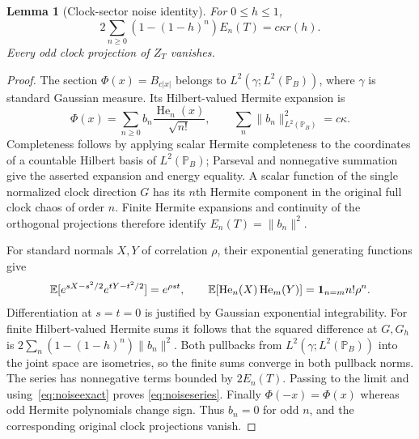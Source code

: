\documentclass[11pt]{article}
\newtheorem{lemma}[theorem]{Lemma}
\begin{document}
\begin{lemma}[Clock-sector noise identity]\label{lem:noiseseries}
For $0\leq h\leq1$,
\begin{equation}\label{eq:noiseseries}
 2\sum_{n\geq0}(1-(1-h)^n)E_n(T)=c\kappa r(h).
\end{equation}
Every odd clock projection of $Z_T$ vanishes.
\end{lemma}
\begin{proof}
The section $\Phi(x)=B_{c|x|}$ belongs to
$L^2(\gamma;L^2(\mathbb P_B))$, where $\gamma$ is standard Gaussian
measure. Its Hilbert-valued Hermite expansion is
\[
 \Phi(x)=\sum_{n\geq0}b_n\frac{\operatorname{He}_n(x)}{\sqrt{n!}},
 \qquad \sum_n\|b_n\|_{L^2(\mathbb P_B)}^2=c\kappa.
\]
Completeness follows by applying scalar Hermite completeness to the
coordinates of a countable Hilbert basis of $L^2(\mathbb P_B)$;
Parseval and nonnegative summation give the asserted expansion and
energy equality. A scalar function of the single normalized clock
direction $G$ has its $n$th Hermite component in the original full
clock chaos of order $n$. Finite Hermite expansions and continuity
of the orthogonal projections therefore identify
$E_n(T)=\|b_n\|^2$.

For standard normals $X,Y$ of correlation $\rho$, their exponential
generating functions give
\[
 \mathbb E[e^{sX-s^2/2}e^{tY-t^2/2}]=e^{\rho st},\qquad
 \mathbb E[\operatorname{He}_n(X)\operatorname{He}_m(Y)]
   =\mathbf1_{n=m}n!\rho^n.
\]
Differentiation at $s=t=0$ is justified by Gaussian exponential
integrability. For finite Hilbert-valued Hermite sums it follows that
the squared difference at $G,G_h$ is
$2\sum_n(1-(1-h)^n)\|b_n\|^2$.
Both pullbacks from $L^2(\gamma;L^2(\mathbb P_B))$ into the joint
space are isometries, so the finite sums converge in both pullback
norms. The series has nonnegative terms bounded by $2E_n(T)$.
Passing to the limit and using~\eqref{eq:noiseexact} proves
\eqref{eq:noiseseries}. Finally $\Phi(-x)=\Phi(x)$ whereas odd
Hermite polynomials change sign. Thus $b_n=0$ for odd $n$, and
the corresponding original clock projections vanish.
\end{proof}
\end{document}
